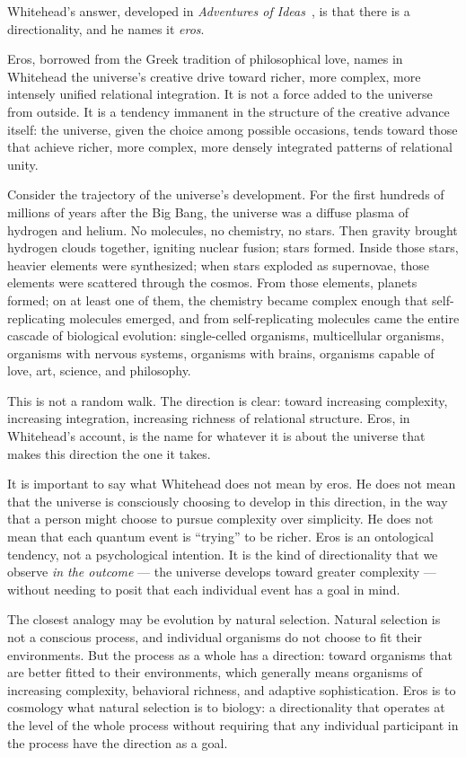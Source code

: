 Whitehead's answer, developed in \textit{Adventures of Ideas}~\citeyearpar{Whitehead1933},
is that there is a directionality, and he names it \emph{eros}.

Eros, borrowed from the Greek tradition of philosophical love, names in
Whitehead the universe's creative drive toward richer, more complex,
more intensely unified relational integration.
It is not a force added to the universe from outside.
It is a tendency immanent in the structure of the creative advance itself:
the universe, given the choice among possible occasions, tends toward those
that achieve richer, more complex, more densely integrated patterns of
relational unity.

Consider the trajectory of the universe's development.
For the first hundreds of millions of years after the Big Bang, the universe
was a diffuse plasma of hydrogen and helium.
No molecules, no chemistry, no stars.
Then gravity brought hydrogen clouds together, igniting nuclear fusion;
stars formed.
Inside those stars, heavier elements were synthesized; when stars exploded
as supernovae, those elements were scattered through the cosmos.
From those elements, planets formed; on at least one of them, the chemistry
became complex enough that self-replicating molecules emerged, and from
self-replicating molecules came the entire cascade of biological evolution:
single-celled organisms, multicellular organisms, organisms with nervous
systems, organisms with brains, organisms capable of love, art, science,
and philosophy.

This is not a random walk.
The direction is clear: toward increasing complexity, increasing integration,
increasing richness of relational structure.
Eros, in Whitehead's account, is the name for whatever it is about
the universe that makes this direction the one it takes.

It is important to say what Whitehead does not mean by eros.
He does not mean that the universe is consciously choosing to develop in
this direction, in the way that a person might choose to pursue complexity
over simplicity.
He does not mean that each quantum event is ``trying'' to be richer.
Eros is an ontological tendency, not a psychological intention.
It is the kind of directionality that we observe \emph{in the outcome} ---
the universe develops toward greater complexity --- without needing to
posit that each individual event has a goal in mind.

The closest analogy may be evolution by natural selection.
Natural selection is not a conscious process, and individual organisms do
not choose to fit their environments.
But the process as a whole has a direction: toward organisms that are better
fitted to their environments, which generally means organisms of increasing
complexity, behavioral richness, and adaptive sophistication.
Eros is to cosmology what natural selection is to biology: a directionality
that operates at the level of the whole process without requiring that any
individual participant in the process have the direction as a goal.

